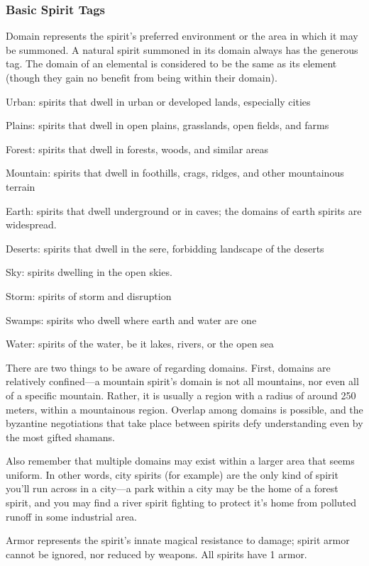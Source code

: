 \subsubsection{Basic Spirit Tags}
Domain represents the spirit’s preferred environment or the area in which it may be summoned. A natural spirit summoned in its domain always has the generous tag. The domain of an elemental is considered to be the same as its element (though they gain no benefit from being within their domain).

Urban: spirits that dwell in urban or developed lands, especially cities

Plains: spirits that dwell in open plains, grasslands, open fields, and farms

Forest: spirits that dwell in forests, woods, and similar areas

Mountain: spirits that dwell in foothills, crags, ridges, and other mountainous terrain

Earth: spirits that dwell underground or in caves; the domains of earth spirits are widespread.

Deserts: spirits that dwell in the sere, forbidding landscape of the deserts

Sky: spirits dwelling in the open skies.

Storm: spirits of storm and disruption

Swamps: spirits who dwell where earth and water are one

Water: spirits of the water, be it lakes, rivers, or the open sea

There are two things to be aware of regarding domains. First, domains are relatively confined—a mountain spirit’s domain is not all mountains, nor even all of a specific mountain. Rather, it is usually a region with a radius of around 250 meters, within a mountainous region. Overlap among domains is possible, and the byzantine negotiations that take place between spirits defy understanding even by the most gifted shamans.

Also remember that multiple domains may exist within a larger area that seems uniform. In other words, city spirits (for example) are the only kind of spirit you’ll run across in a city—a park within a city may be the home of a forest spirit, and you may find a river spirit fighting to protect it’s home from polluted runoff in some industrial area.

Armor represents the spirit’s innate magical resistance to damage; spirit armor cannot be ignored, nor reduced by weapons. All spirits have 1 armor.

